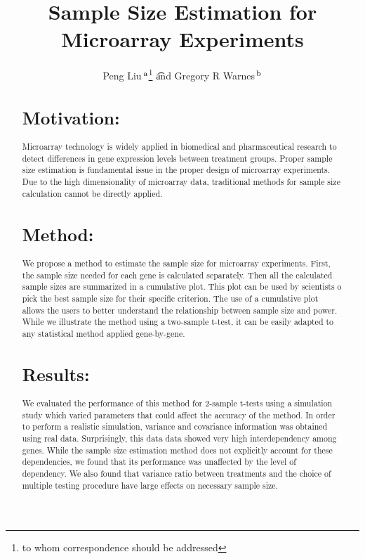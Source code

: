 \documentclass{bioinfo}
\begin{document}

\title{Sample Size Estimation for Microarray Experiments}
\author{Peng Liu\,$^{\rm a}$\footnote{to whom correspondence should be addressed} \t and
       Gregory R Warnes\,$^{\rm b}$}
\address{$^{\rm a}$Department of Biological Statistics and Computational Biology, Cornell University, Ithaca, NY 14853 \\
         $^{\rm b}$Pfizer Global Research and Development, Groton, CT 06340}
\maketitle

\begin{abstract}

\section{Motivation:}
Microarray technology is widely applied in biomedical and
pharmaceutical research to detect differences in gene expression
levels between treatment groups. Proper sample size estimation is
fundamental issue in the proper design of microarray
experiments. Due to the high dimensionality of microarray data,
traditional methods for sample size calculation cannot be directly
applied.

\section{Method:}
We propose a method to estimate the sample size for microarray
experiments. First, the sample size needed for each gene is
calculated separately. Then all the calculated sample sizes are
summarized in a cumulative plot.  This plot can be used by
scientists o pick the best sample size for their specific criterion.
The use of a cumulative plot allows the users to better understand
the relationship between sample size and power.  While we illustrate
the method using a two-sample t-test, it can be easily adapted to
any statistical method applied gene-by-gene.

\section{Results:}
We evaluated the performance of this method for 2-sample t-tests
using a simulation study which varied parameters that could affect
the accuracy of the method.  In order to perform a realistic
simulation, variance and covariance information was obtained using
real data.  Surprisingly, this data data showed very high
interdependency among genes. While the sample size estimation method
does not explicitly account for these dependencies, we found that
its performance was unaffected by the level of dependency. We also
found that variance ratio between treatments and the choice of
multiple testing procedure have large effects on necessary sample
size.


\end{abstract}
\end{document}
